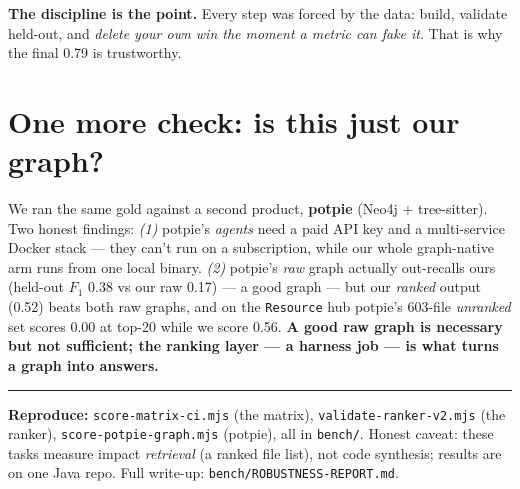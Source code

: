 \documentclass[11pt]{article}
\newenvironment{takeaway}
  {\par\vspace{4pt}\noindent\begin{lrbox}{\takeawaybox}%
   \begin{minipage}{\dimexpr\linewidth-18pt\relax}\small\setlength{\parskip}{2pt}}
  {\end{minipage}\end{lrbox}%
   \setlength{\fboxsep}{8pt}\setlength{\fboxrule}{0.8pt}%
   \fcolorbox{accent}{soft}{\usebox{\takeawaybox}}\par\vspace{4pt}}
\begin{document}
\begin{takeaway}
\textbf{The discipline is the point.} Every step was forced by the data: build, validate held-out,
and \emph{delete your own win the moment a metric can fake it}. That is why the final 0.79 is
trustworthy.
\end{takeaway}

\section{One more check: is this just our graph?}
We ran the same gold against a second product, \textbf{potpie} (Neo4j + tree-sitter). Two honest
findings: \emph{(1)} potpie's \emph{agents} need a paid API key and a multi-service Docker stack ---
they can't run on a subscription, while our whole graph-native arm runs from one local binary. \emph{(2)}
potpie's \emph{raw} graph actually out-recalls ours (held-out $F_1$ 0.38 vs our raw 0.17) --- a good
graph --- but our \emph{ranked} output (0.52) beats both raw graphs, and on the \texttt{Resource} hub
potpie's 603-file \emph{unranked} set scores 0.00 at top-20 while we score 0.56. \textbf{A good raw
graph is necessary but not sufficient; the ranking layer --- a harness job --- is what turns a graph
into answers.}

\vspace{4pt}
\hrule
\vspace{4pt}
\noindent\small\textbf{Reproduce:} \texttt{score-\allowbreak matrix-\allowbreak ci.mjs} (the matrix),
\texttt{validate-\allowbreak ranker-\allowbreak v2.mjs} (the ranker), \texttt{score-\allowbreak potpie-\allowbreak graph.mjs} (potpie), all in \texttt{bench/}.
Honest caveat: these tasks measure impact \emph{retrieval} (a ranked file list), not code synthesis;
results are on one Java repo. Full write-up: \texttt{bench/ROBUSTNESS-REPORT.md}.
\end{document}
